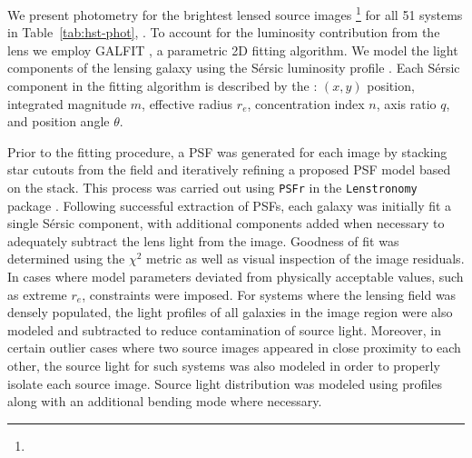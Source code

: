 
\clearpage

We present \hst photometry for the brightest lensed source images \footnote{} for all 51 systems in Table~\ref{tab:hst-phot}, 
.
To account for the luminosity contribution from the lens we employ GALFIT \citep{Peng2010a}, a parametric 2D fitting algorithm.  
We model the 
light components of the lensing galaxy using 
the S\'ersic luminosity profile \citep{sersic1963a}. Each S\'ersic component in the fitting algorithm is described by the : $(x,y)$ position, integrated magnitude $m$, effective radius $r_e$, concentration index $n$, axis ratio $q$, and position angle $\theta$.
\par Prior to the fitting procedure, a PSF was generated for each image by stacking star cutouts from the field and iteratively refining a proposed PSF model based on the stack. This process was carried out using \texttt{PSFr} 
in the \texttt{Lenstronomy} package \citep{birrer2021a}. Following successful extraction of PSFs, each galaxy was initially fit  a single S\'ersic component, with additional components added when necessary to adequately subtract the lens light from the image. Goodness of fit was determined using the $\chi^2$ metric as well as visual inspection of the image residuals. In cases where model parameters deviated from physically acceptable values, such as extreme $r_e$, constraints were imposed. For systems where the lensing field was densely populated, the light profiles of all galaxies in the image region were also modeled and subtracted to reduce contamination of source light. Moreover, in certain outlier cases where 
two source images appeared in close proximity to each other, the source light for such systems was also modeled in order to properly isolate each source image. Source light distribution was modeled using \ser profiles along with an additional bending mode where necessary.


